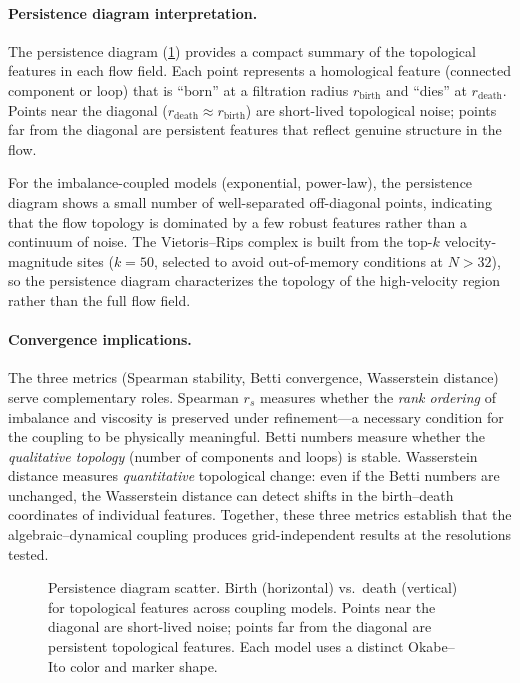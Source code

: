 \documentclass[12pt,openany]{report}
\theoremstyle{definition}
\theoremstyle{plain}
\theoremstyle{remark}
\begin{document}
\paragraph{Persistence diagram interpretation.}
The persistence diagram (\cref{fig:persistence}) provides a compact
summary of the topological features in each flow field.  Each point
represents a homological feature (connected component or loop) that is
``born'' at a filtration radius $r_{\mathrm{birth}}$ and ``dies'' at
$r_{\mathrm{death}}$.  Points near the diagonal ($r_{\mathrm{death}}
\approx r_{\mathrm{birth}}$) are short-lived topological noise; points
far from the diagonal are persistent features that reflect genuine
structure in the flow.

For the imbalance-coupled models (exponential, power-law), the
persistence diagram shows a small number of well-separated off-diagonal
points, indicating that the flow topology is dominated by a few robust
features rather than a continuum of noise.  The Vietoris--Rips complex
is built from the top-$k$ velocity-magnitude sites ($k = 50$, selected
to avoid out-of-memory conditions at $N > 32$), so the persistence
diagram characterizes the topology of the high-velocity region rather
than the full flow field.

\paragraph{Convergence implications.}
The three metrics (Spearman stability, Betti convergence, Wasserstein
distance) serve complementary roles.  Spearman $r_s$ measures whether
the \emph{rank ordering} of imbalance and viscosity is preserved
under refinement---a necessary condition for the coupling to be
physically meaningful.  Betti numbers measure whether the
\emph{qualitative topology} (number of components and loops) is stable.
Wasserstein distance measures \emph{quantitative} topological change:
even if the Betti numbers are unchanged, the Wasserstein distance can
detect shifts in the birth--death coordinates of individual features.
Together, these three metrics establish that the algebraic--dynamical
coupling produces grid-independent results at the resolutions tested.

\begin{figure}[htbp]
\centering

\caption{Persistence diagram scatter.  Birth (horizontal) vs.\ death
(vertical) for topological features across coupling models.  Points
near the diagonal are short-lived noise; points far from the diagonal
are persistent topological features.  Each model uses a distinct
Okabe--Ito color and marker shape.}
\label{fig:persistence}
\end{figure}
\end{document}
